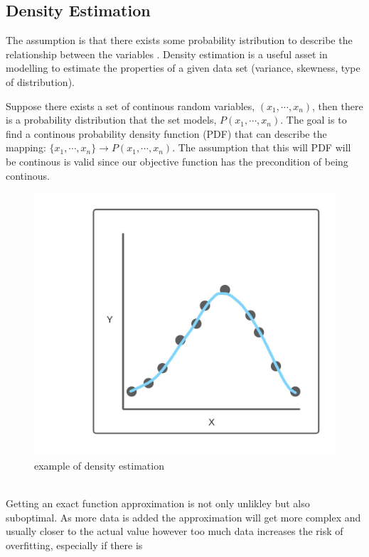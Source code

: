 \documentclass[10pt,a4paper]{report}
\begin{document}
				\subsection{Density Estimation}
					The assumption is that there exists some probability istribution to describe the relationship between the variables \autocite{sheather2004density}.
					Density estimation is a useful asset in modelling to estimate the properties of a given data set (variance, skewness, type of distribution). \par
					Suppose there exists a set of continous random variables, $(x_1,\cdots,x_n)$, then there is a
					probability distribution that the set models, $P(x_1,\cdots,x_n)$. The goal is to find a continous probability density function (PDF)
					that can describe the mapping: $\{x_1,\cdots,x_n\} \to P(x_1,\cdots,x_n)$. The assumption that this will PDF will be continous is valid
					since our objective function has the precondition of being continous.
					\begin{figure}[h]
						\centering
						\includegraphics[scale=0.2]{density-estimation-diagram.jpg}
						\caption{example of density estimation}
						\label{fig:density-estimation}
					\end{figure} \\
					Getting an exact function approximation is not only unlikley but also suboptimal. As more data is added the approximation will
					get more complex and usually closer to the actual value however too much data increases the risk of overfitting, especially if there is
\end{document}
